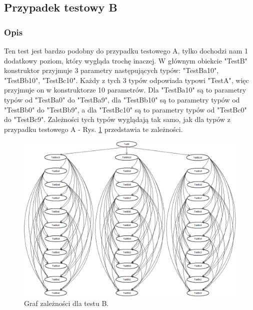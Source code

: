 \documentclass[12pt]{article}
\begin{document}
\subsection{Przypadek testowy B}
\subsubsection{Opis}
Ten test jest bardzo podobny do przypadku testowego A, tylko dochodzi nam 1 dodatkowy poziom, który wygląda trochę inaczej. W głównym obiekcie "TestB" konstruktor przyjmuje 3 parametry następujących typów: "TestBa10", "TestBb10", "TestBc10". Każdy z tych 3 typów odpowiada typowi "TestA", więc przyjmuje on w konstruktorze 10 parametrów. Dla "TestBa10" są to parametry typów od "TestBa0" do "TestBa9", dla "TestBb10" są to parametry typów od "TestBb0" do "TestBb9", a dla "TestBc10" są to parametry typów od "TestBc0" do "TestBc9". Zależności tych typów wyglądają tak samo, jak dla typów z przypadku testowego A - Rys. \ref{fig:testB} przedstawia te zależności.\\
\begin{figure}[h]
	\begin{center}
  		\includegraphics[width=\linewidth]{TestB.png}
  		\caption{Graf zależności dla testu B.}
  		\label{fig:testB}
	\end{center}
\end{figure}
\end{document}
